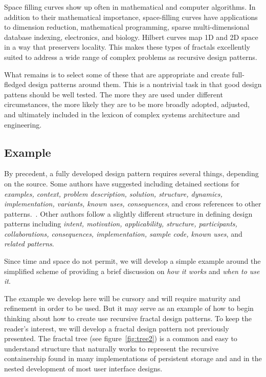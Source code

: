\documentclass[jou,apacite]{apa6}
\begin{document}
Space filling curves show up often in mathematical and computer algorithms.  In addition to their mathematical importance, space-filling curves have applications to dimension reduction, mathematical programming, sparse multi-dimensional database indexing, electronics, and biology.  Hilbert curves map 1D and 2D space in a way that preservers locality.  This makes these types of fractals excellently suited to address a wide range of complex problems as recursive design patterns.

What remains is to select some of these that are appropriate and create full-fledged design patterns around them.  This is a nontrivial task in that good design pattens should be well tested.  The more they are used under different circumstances, the more likely they are to be more broadly adopted, adjusted, and ultimately included in the lexicon of complex systems architecture and engineering.

\subsection{Example} 
By precedent, a fully developed design pattern requires several things, depending on the source.  Some authors have suggested including detained sections for \emph{examples, context, problem description, solution, structure, dynamics, implementation, variants, known uses, consequences}, and cross references to other patterns.~\cite{Buschmann}.  Other authors follow a slightly different structure in defining design patterns including \emph{intent, motivation, applicability, structure, participants, collaborations, consequences, implementation, sample code, known uses}, and \emph{related patterns}.~\cite{Gamma}

Since time and space do not permit, we will develop a simple example around the simplified scheme of providing a brief discussion on \emph{how it works} and \emph{when to use it}.~\cite{Fowler}

The example we develop here will be cursory and will require maturity and refinement in order to be used.  But it may serve as an example of how to begin thinking about how to create use recursive fractal design patterns.  To keep the reader's interest, we will develop a fractal design pattern not previously presented.  The fractal tree (see figure~\ref{fig:tree2}) is a common and easy to understand structure that naturally works to represent the recursive containership found in many implementations of persistent storage and and in the nested development of most user interface designs.
\end{document}
